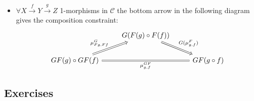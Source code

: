 \begin{defi}
\begin{itemize}
\begin{itemize}
			\item 
			$ \forall X \xrightarrow{ f } Y \xrightarrow{ g } Z$ 
			1-morphisms in $ \mathcal{ C }$ the bottom arrow in the following diagram gives the composition constraint:
			\[
			\begin{tikzcd}
				&
				G ( F ( g ) \circ F ( f ) )
				\ar[rd, Rightarrow, " G ( \mu_{ g , f }^F) "]
				\\
				GF ( g ) \circ GF ( f ) 
				\ar[ru, Rightarrow, " \mu_{ F g , F f }^G"]
				\ar[rr, Rightarrow, equal, " \mu_{ g , f }^{ G F }"']
				&&
				GF ( g \circ f )
			\end{tikzcd}
			\]
		\end{itemize}
	\end{itemize}
\end{defi}

\subsection{Exercises}

